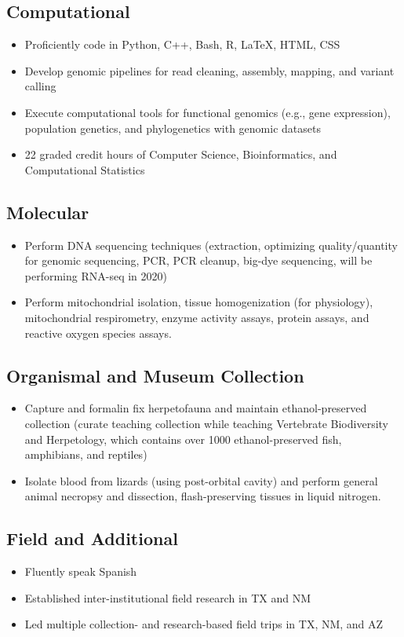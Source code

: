 \subsection{Computational}
\begin{itemize}
	\item{Proficiently code in Python, C++, Bash, R, LaTeX, HTML, CSS}
	\item{Develop genomic pipelines for read cleaning, assembly, mapping, and variant calling}
	\item{Execute computational tools for functional genomics (e.g., gene expression), population genetics, and phylogenetics with genomic datasets}
	\item{22 graded credit hours of Computer Science, Bioinformatics, and Computational Statistics}
\end{itemize}
\subsection{Molecular}
\begin{itemize}
	\item{Perform DNA sequencing techniques (extraction, optimizing quality/quantity for genomic sequencing, PCR, PCR cleanup, big-dye sequencing, will be performing RNA-seq in 2020)}
	\item{Perform mitochondrial isolation, tissue homogenization (for physiology), mitochondrial respirometry, enzyme activity assays, protein assays, and reactive oxygen species assays.}
\end{itemize}
\subsection{Organismal and Museum Collection}
\begin{itemize}
	\item{Capture and formalin fix herpetofauna and maintain ethanol-preserved collection (curate teaching collection while teaching Vertebrate Biodiversity and Herpetology, which contains over 1000 ethanol-preserved fish, amphibians, and reptiles)}
	\item{Isolate blood from lizards (using post-orbital cavity) and perform general animal necropsy and dissection, flash-preserving tissues in liquid nitrogen.}
\end{itemize}
\subsection{Field and Additional}
\begin{itemize}
	\item{Fluently speak Spanish}
	\item{Established inter-institutional field research in TX and NM}
	\item{Led multiple collection- and research-based field trips in TX, NM, and AZ}
\end{itemize}

